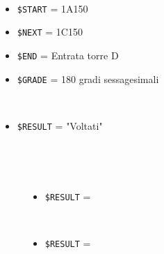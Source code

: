 \documentclass[../../SperimentazioniPratiche.tex]{subfiles}
\begin{document}
			\begin{tcolorbox}[fonttitle=\bfseries, 
								adjusted title={\Large Prova 16A.1}, 
								breakable, 
								sharp corners=south,
								colback=white, 
								colframe=white!60!black]
				
				\begin{description}[leftmargin=0.7cm,labelwidth=!]
				
					\item[Input] \ \par 
        				\begin{itemize}
        					\item \verb|$START| = 1A150
							\item \verb|$NEXT| = 1C150
							\item \verb|$END| = Entrata torre D
        					\item \verb|$GRADE| = 180 gradi sessagesimali
        				\end{itemize}
        				
        			\tcbline 
        				
        			\item[Output atteso] \ \par
        				\begin{itemize}
        					\item \verb|$RESULT| = "Voltati"
        				\end{itemize}

					\tcbline        				
        				
        			\item[Output riscontrato] \ \par
        				\begin{description}
        				
        					\item[\dispositivoA] \ \par
        					\begin{itemize}
        						\item \verb|$RESULT| = \ok
        					\end{itemize}      					
        					
        					\item[\dispositivoB] \ \par
        					\begin{itemize}
        						\item \verb|$RESULT| = \ok
        					\end{itemize}
        					

\end{description}
\end{description}
\end{tcolorbox}
\end{document}
